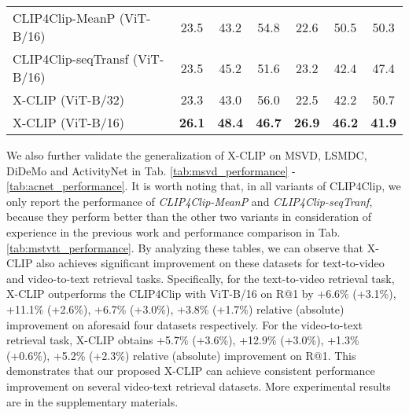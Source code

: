 \documentclass[sigconf]{acmart}
\begin{document}
\begin{table}[]
{\begin{tabular}{l|ccc|ccc}
CLIP4Clip-MeanP (ViT-B/16) \cite{luo2021clip4clip} & 23.5          & 43.2          & 54.8          & 22.6          & 50.5          & 50.3          \\ 
CLIP4Clip-seqTransf (ViT-B/16) \cite{luo2021clip4clip} & 23.5          & 45.2          & 51.6          & 23.2          & 42.4          & 47.4          \\ 
\hline
X-CLIP (ViT-B/32)    & 23.3          & 43.0          & 56.0          & 22.5          & 42.2          & 50.7          \\
X-CLIP (ViT-B/16)    & \textbf{26.1} & \textbf{48.4} & \textbf{46.7} & \textbf{26.9} & \textbf{46.2} & \textbf{41.9} \\ \hline
\end{tabular}
}
\vspace{-0.2cm}
\label{tab:lsmdc_performance}
\end{table}

We also further validate the generalization of X-CLIP on MSVD, LSMDC, DiDeMo and ActivityNet in Tab. \ref{tab:msvd_performance} - \ref{tab:acnet_performance}. It is worth noting that, in all variants of CLIP4Clip, we only report the performance of \emph{CLIP4Clip-MeanP} and \emph{CLIP4Clip-seqTranf}, because they perform better than the other two variants in consideration of experience in the previous work \cite{luo2021clip4clip} and performance comparison in Tab. \ref{tab:mstvtt_performance}. By analyzing these tables, we can observe that X-CLIP also achieves significant improvement on these datasets for text-to-video and video-to-text retrieval tasks. Specifically, for the text-to-video retrieval task, X-CLIP outperforms the CLIP4Clip with ViT-B/16 on R@1 by +6.6\% (+3.1\%), +11.1\% (+2.6\%), +6.7\% (+3.0\%), +3.8\% (+1.7\%) relative (absolute) improvement on aforesaid four datasets respectively. For the video-to-text retrieval task, X-CLIP obtains +5.7\% (+3.6\%), +12.9\% (+3.0\%), +1.3\% (+0.6\%), +5.2\% (+2.3\%) relative (absolute) improvement on R@1. This demonstrates that our proposed X-CLIP can achieve consistent performance improvement on several video-text retrieval datasets. More experimental results are in the supplementary materials. 
\end{document}
